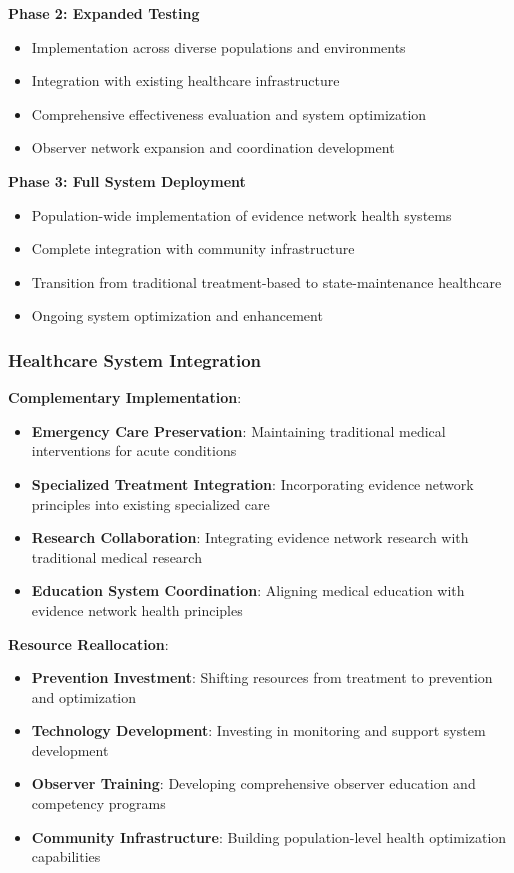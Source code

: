 \documentclass[12pt,a4paper]{article}
\begin{document}
\textbf{Phase 2: Expanded Testing}
\begin{itemize}
\item Implementation across diverse populations and environments
\item Integration with existing healthcare infrastructure
\item Comprehensive effectiveness evaluation and system optimization
\item Observer network expansion and coordination development
\end{itemize}

\textbf{Phase 3: Full System Deployment}
\begin{itemize}
\item Population-wide implementation of evidence network health systems
\item Complete integration with community infrastructure
\item Transition from traditional treatment-based to state-maintenance healthcare
\item Ongoing system optimization and enhancement
\end{itemize}

\subsubsection{Healthcare System Integration}

\textbf{Complementary Implementation}:
\begin{itemize}
\item \textbf{Emergency Care Preservation}: Maintaining traditional medical interventions for acute conditions
\item \textbf{Specialized Treatment Integration}: Incorporating evidence network principles into existing specialized care
\item \textbf{Research Collaboration}: Integrating evidence network research with traditional medical research
\item \textbf{Education System Coordination}: Aligning medical education with evidence network health principles
\end{itemize}

\textbf{Resource Reallocation}:
\begin{itemize}
\item \textbf{Prevention Investment}: Shifting resources from treatment to prevention and optimization
\item \textbf{Technology Development}: Investing in monitoring and support system development
\item \textbf{Observer Training}: Developing comprehensive observer education and competency programs
\item \textbf{Community Infrastructure}: Building population-level health optimization capabilities
\end{itemize}
\end{document}
